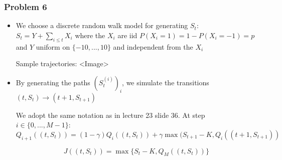 \documentclass[12pt]{article}
\newcommand{\Q}[1]{\subsubsection*{Problem #1}}
\begin{document}
\Q{6}

\begin{itemize}
\item
  We choose a discrete random walk model for generating $S_t$:
  $S_t = Y + \sum_{i \le t} X_i$ where
  the $X_i$ are iid $P(X_i = 1) = 1 - P(X_i = -1) = p$
  and $Y$ uniform on $\{-10, ..., 10\}$ and independent from the $X_i$

  Sample trajectories:
  <Image>
\item 
  By generating the paths $(S_t^{(i)})_i$,
  we simulate the transitions $(t, S_t) \rightarrow (t+1, S_{t+1})$

    We adopt the same notation as in lecture 23 slide 36.
    At step $i \in \{0, ..., M-1\}$:
    $$Q_{i+1}((t, S_t)) =  (1-\gamma)Q_i((t, S_t)) + \gamma \max( S_{t+1} - K, Q_i((t+1, S_{t+1}))$$
    
    $$J((t, S_t)) = \max \{ S_t - K, Q_M((t, S_t)) \}$$
\end{itemize}
\end{document}
